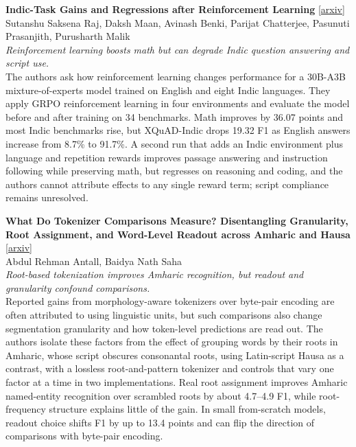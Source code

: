 \documentclass[12pt,letterpaper]{article}
\begin{document}
\medskip
\begin{minipage}{\linewidth}
{\small\textbf{Indic-Task Gains and Regressions after Reinforcement Learning}} {\scriptsize[\href{https://arxiv.org/abs/2611.16228}{arxiv}]}\\
{\scriptsize Sutanshu Saksena Raj, Daksh Maan, Avinash Benki, Parijat Chatterjee, Pasunuti Prasanjith, Purusharth Malik}\\
{\footnotesize\textit{Reinforcement learning boosts math but can degrade Indic question answering and script use.}}\\[2pt]
{\footnotesize The authors ask how reinforcement learning changes performance for a 30B-A3B mixture-of-experts model trained on English and eight Indic languages. They apply GRPO reinforcement learning in four environments and evaluate the model before and after training on 34 benchmarks. Math improves by 36.07 points and most Indic benchmarks rise, but XQuAD-Indic drops 19.32 F1 as English answers increase from 8.7\% to 91.7\%. A second run that adds an Indic environment plus language and repetition rewards improves passage answering and instruction following while preserving math, but regresses on reasoning and coding, and the authors cannot attribute effects to any single reward term; script compliance remains unresolved.}
\end{minipage}

\medskip
\begin{minipage}{\linewidth}
{\small\textbf{What Do Tokenizer Comparisons Measure? Disentangling Granularity, Root Assignment, and Word-Level Readout across Amharic and Hausa}} {\scriptsize[\href{https://arxiv.org/abs/2611.14818}{arxiv}]}\\
{\scriptsize Abdul Rehman Antall, Baidya Nath Saha}\\
{\footnotesize\textit{Root-based tokenization improves Amharic recognition, but readout and granularity confound comparisons.}}\\[2pt]
{\footnotesize Reported gains from morphology-aware tokenizers over byte-pair encoding are often attributed to using linguistic units, but such comparisons also change segmentation granularity and how token-level predictions are read out. The authors isolate these factors from the effect of grouping words by their roots in Amharic, whose script obscures consonantal roots, using Latin-script Hausa as a contrast, with a lossless root-and-pattern tokenizer and controls that vary one factor at a time in two implementations. Real root assignment improves Amharic named-entity recognition over scrambled roots by about 4.7--4.9 F1, while root-frequency structure explains little of the gain. In small from-scratch models, readout choice shifts F1 by up to 13.4 points and can flip the direction of comparisons with byte-pair encoding.}
\end{minipage}
\end{document}
